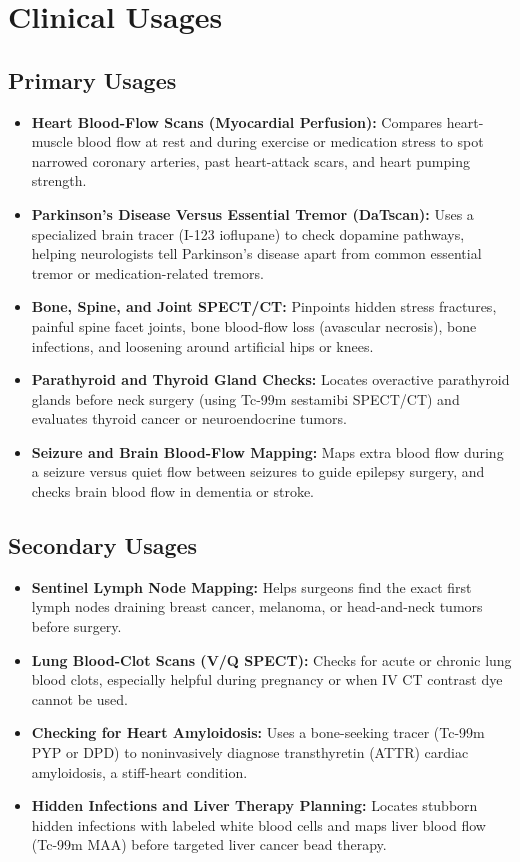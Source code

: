 \section{Clinical Usages}

\subsection{Primary Usages}

\begin{itemize}
    \item \textbf{Heart Blood-Flow Scans (Myocardial Perfusion):} Compares heart-muscle blood flow at rest and during exercise or medication stress to spot narrowed coronary arteries, past heart-attack scars, and heart pumping strength.
    \item \textbf{Parkinson's Disease Versus Essential Tremor (DaTscan):} Uses a specialized brain tracer (I-123 ioflupane) to check dopamine pathways, helping neurologists tell Parkinson's disease apart from common essential tremor or medication-related tremors.
    \item \textbf{Bone, Spine, and Joint SPECT/CT:} Pinpoints hidden stress fractures, painful spine facet joints, bone blood-flow loss (avascular necrosis), bone infections, and loosening around artificial hips or knees.
    \item \textbf{Parathyroid and Thyroid Gland Checks:} Locates overactive parathyroid glands before neck surgery (using Tc-99m sestamibi SPECT/CT) and evaluates thyroid cancer or neuroendocrine tumors.
    \item \textbf{Seizure and Brain Blood-Flow Mapping:} Maps extra blood flow during a seizure versus quiet flow between seizures to guide epilepsy surgery, and checks brain blood flow in dementia or stroke.
\end{itemize}

\subsection{Secondary Usages}

\begin{itemize}
    \item \textbf{Sentinel Lymph Node Mapping:} Helps surgeons find the exact first lymph nodes draining breast cancer, melanoma, or head-and-neck tumors before surgery.
    \item \textbf{Lung Blood-Clot Scans (V/Q SPECT):} Checks for acute or chronic lung blood clots, especially helpful during pregnancy or when IV CT contrast dye cannot be used.
    \item \textbf{Checking for Heart Amyloidosis:} Uses a bone-seeking tracer (Tc-99m PYP or DPD) to noninvasively diagnose transthyretin (ATTR) cardiac amyloidosis, a stiff-heart condition.
    \item \textbf{Hidden Infections and Liver Therapy Planning:} Locates stubborn hidden infections with labeled white blood cells and maps liver blood flow (Tc-99m MAA) before targeted liver cancer bead therapy.
\end{itemize}

